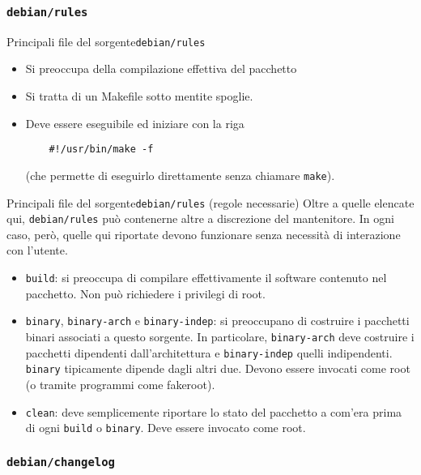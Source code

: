 \documentclass{beamer}
\begin{document}
\subsubsection{{\tt debian/rules}}

\begin{frame}[fragile]{Principali file del sorgente}{{\tt debian/rules}}
	\begin{itemize}
	\item Si preoccupa della compilazione effettiva del pacchetto
	\pause
	\item Si tratta di un Makefile sotto mentite spoglie.
	\pause
	\item Deve essere eseguibile ed iniziare con la riga
	\begin{verbatim}
	#!/usr/bin/make -f
	\end{verbatim}
	(che permette di eseguirlo direttamente senza chiamare {\tt make}).
	\end{itemize}
\end{frame}

\begin{frame}[fragile]{Principali file del sorgente}{{\tt debian/rules} (regole necessarie)}
	Oltre a quelle elencate qui, {\tt debian/rules} può contenerne altre a discrezione del mantenitore. In ogni caso, però, quelle qui riportate devono funzionare senza necessità di interazione con l'utente.
	\begin{itemize}
		\pause
		\item {\tt build}: si preoccupa di compilare effettivamente il software contenuto nel pacchetto. Non può richiedere i privilegi di root.
		\pause
		\item {\tt binary}, {\tt binary-arch} e {\tt binary-indep}: si preoccupano di costruire i pacchetti binari associati a questo sorgente. In particolare, {\tt binary-arch} deve costruire i pacchetti dipendenti dall'architettura e {\tt binary-indep} quelli indipendenti. {\tt binary} tipicamente dipende dagli altri due. Devono essere invocati come root (o tramite programmi come fakeroot).
		\pause
		\item {\tt clean}: deve semplicemente riportare lo stato del pacchetto a com'era prima di ogni {\tt build} o {\tt binary}. Deve essere invocato come root.
	\end{itemize}
\end{frame}

\subsubsection{{\tt debian/changelog}}
\end{document}
